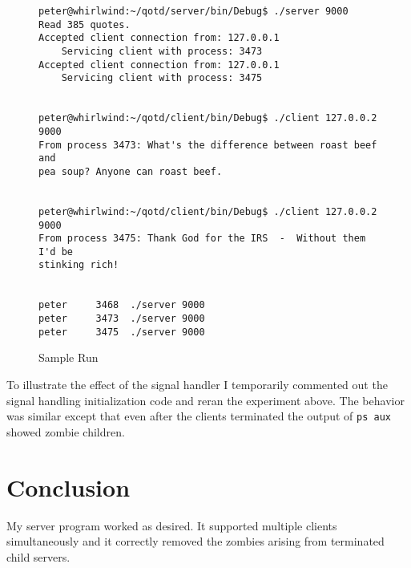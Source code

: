 \documentclass{article}
\newcommand{\command}[1]{\texttt{#1}}
\begin{document}
\begin{figure}[tbhp]
\begin{Verbatim}[fontsize=\small, frame=single, commandchars=\\\{\}]
peter@whirlwind:~/qotd/server/bin/Debug$ ./server 9000
Read 385 quotes.
Accepted client connection from: 127.0.0.1
	Servicing client with process: 3473
Accepted client connection from: 127.0.0.1
	Servicing client with process: 3475


peter@whirlwind:~/qotd/client/bin/Debug$ ./client 127.0.0.2 9000
From process 3473: What's the difference between roast beef and
pea soup? Anyone can roast beef.


peter@whirlwind:~/qotd/client/bin/Debug$ ./client 127.0.0.2 9000
From process 3475: Thank God for the IRS  -  Without them I'd be
stinking rich!


peter     3468  ./server 9000
peter     3473  ./server 9000
peter     3475  ./server 9000
\end{Verbatim}
\caption{Sample Run}
\label{fig:sample-run}
\end{figure}

To illustrate the effect of the signal handler I temporarily commented out the signal handling
initialization code and reran the experiment above. The behavior was similar except that even
after the clients terminated the output of \command{ps aux} showed zombie children.

\section{Conclusion}
\label{sec:conclusion}

My server program worked as desired. It supported multiple clients simultaneously and it
correctly removed the zombies arising from terminated child servers.
\end{document}
